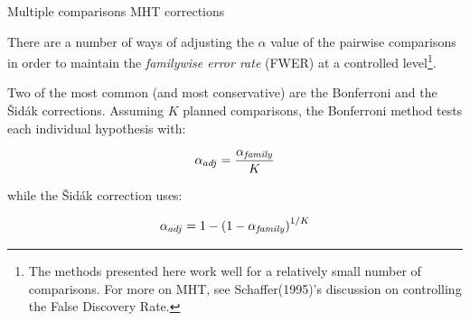 %
%
\begin{frame}
{Multiple comparisons}
{MHT corrections}

There are a number of ways of adjusting the $\alpha$ value of the pairwise comparisons in order to maintain the \textit{familywise error rate} (FWER) at a controlled level\footnote[3]{The methods presented here work well for a relatively small number of comparisons. For more on MHT, see Schaffer(1995)'s discussion on controlling the False Discovery Rate.}.\bigskip

Two of the most common (and most conservative) are the Bonferroni and the \v{S}id\'ak corrections. Assuming $K$ planned comparisons, the Bonferroni method tests each individual hypothesis with:

\begin{equation*}
\alpha_{adj}=\frac{\alpha_{\mbox{\scriptsize \textit{family}}}}{K}
\end{equation*}

\noindent while the \v{S}id\'ak correction uses:

\begin{equation*}
\alpha_{adj}=1 - \left(1-\alpha_{\mbox{\scriptsize \textit{family}}}\right)^{1/K}
\end{equation*}
\end{frame}
%
%
%
%
